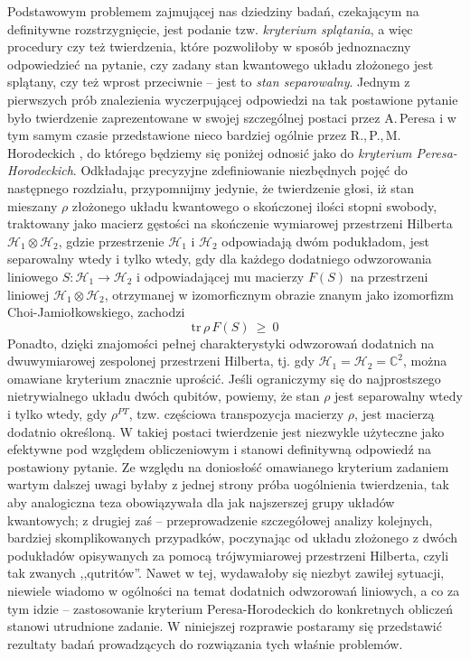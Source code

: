 Podstawowym problemem zajmującej nas dziedziny badań,
czekającym na definitywne rozstrzygnięcie,
jest podanie tzw. \emph{kryterium splątania},
a więc procedury czy też twierdzenia,
które pozwoliłoby w sposób jednoznaczny odpowiedzieć na pytanie,
czy zadany stan kwantowego układu złożonego jest splątany,
czy też wprost przeciwnie -- jest to 
 \emph{stan separowalny}.
Jednym z pierwszych prób znalezienia wyczerpującej odpowiedzi na tak postawione
pytanie było twierdzenie zaprezentowane w swojej szczególnej postaci 
przez A.\,Peresa
\cite{peres1996separability}
i w tym samym czasie przedstawione nieco bardziej ogólnie przez
R.,\,P.,\,M.\,Horodeckich
\cite{horodecki1996separability},
do którego będziemy się poniżej odnosić jako do 
 \emph{kryterium Peresa-Horodeckich}.
Odkładając precyzyjne zdefiniowanie niezbędnych pojęć do następnego rozdziału,
przypomnijmy jedynie, że twierdzenie głosi,
iż stan mieszany $\rho$ złożonego układu kwantowego o skończonej ilości
stopni swobody,
traktowany jako macierz gęstości na skończenie wymiarowej przestrzeni 
Hilberta $\mathcal{H}_{1} \otimes \mathcal{H}_{2}$,
gdzie przestrzenie $\mathcal{H}_{1}$ i $\mathcal{H}_{2}$ odpowiadają dwóm podukładom,
jest separowalny wtedy i tylko wtedy,
gdy dla każdego dodatniego odwzorowania liniowego
$S \!: \mathcal{H}_{1} \rightarrow \mathcal{H}_{2}$
i odpowiadającej mu macierzy $F(S)$ na przestrzeni liniowej
$\mathcal{H}_{1} \otimes \mathcal{H}_{2}$,
otrzymanej w izomorficznym obrazie znanym jako izomorfizm Choi-Jamiołkowskiego,
zachodzi
\begin{equation}
    \label{eq:PHcriterionOrig}
    \text{tr} \, \rho \, F(S) \: \geq \: 0
\end{equation}
Ponadto, dzięki znajomości pełnej charakterystyki odwzorowań dodatnich
na dwuwymiarowej zespolonej przestrzeni Hilberta,
tj. gdy $\mathcal{H}_{1} = \mathcal{H}_{2} = \mathbb{C}^{2}$,
można omawiane kryterium znacznie uprościć.
Jeśli ograniczymy się do najprostszego nietrywialnego układu dwóch qubitów,
powiemy,
że stan $\rho$ jest separowalny wtedy i tylko wtedy,
gdy $\rho^{PT}$, tzw. częściowa transpozycja macierzy $\rho$,
jest macierzą dodatnio określoną.
W takiej postaci twierdzenie jest niezwykle użyteczne jako efektywne pod względem
obliczeniowym i stanowi definitywną odpowiedź na postawiony pytanie.
Ze względu na doniosłość omawianego kryterium zadaniem wartym dalszej uwagi
byłaby z jednej strony próba uogólnienia twierdzenia,
tak aby analogiczna teza obowiązywała dla jak najszerszej grupy układów kwantowych;
z drugiej zaś -- przeprowadzenie szczegółowej analizy kolejnych,
bardziej skomplikowanych przypadków,
poczynając od układu złożonego z dwóch podukładów 
opisywanych za pomocą trójwymiarowej przestrzeni Hilberta,
czyli tak zwanych ,,qutritów''.
Nawet w tej,
wydawałoby się niezbyt zawiłej sytuacji,
niewiele wiadomo w ogólności na temat dodatnich odwzorowań liniowych,
a co za tym idzie --
zastosowanie kryterium Peresa-Horodeckich do konkretnych obliczeń stanowi utrudnione zadanie.
W niniejszej rozprawie postaramy się przedstawić rezultaty badań prowadzących
do rozwiązania tych właśnie problemów.


